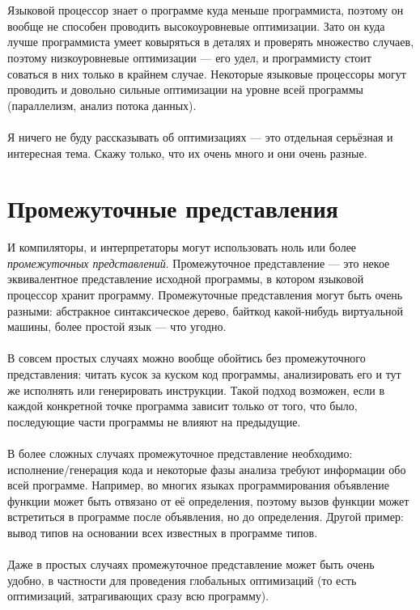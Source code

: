 \documentclass[11pt]{book}
\begin{document}
\\ \\
Языковой процессор знает о программе куда меньше программиста, поэтому он вообще не способен проводить высокоуровневые оптимизации.
Зато он куда лучше программиста умеет ковыряться в деталях и проверять множество случаев,
поэтому низкоуровневые оптимизации --- его удел, и программисту стоит соваться в них только в крайнем случае.
Некоторые языковые процессоры могут проводить и довольно сильные оптимизации
на уровне всей программы (параллелизм, анализ потока данных).
\\ \\
Я ничего не буду рассказывать об оптимизациях --- это отдельная серьёзная и интересная тема.
Скажу только, что их очень много и они очень разные.

\section{Промежуточные представления}
И компиляторы, и интерпретаторы могут использовать ноль или более \emph{промежуточных представлений}.
Промежуточное представление --- это некое эквивалентное представление исходной программы,
в котором языковой процессор хранит программу.
Промежуточные представления могут быть очень разными: абстракное синтаксическое дерево,
байткод какой-нибудь виртуальной машины, более простой язык --- что угодно.
\\ \\
В совсем простых случаях можно вообще обойтись без промежуточного представления:
читать кусок за куском код программы, анализировать его и тут же исполнять или генерировать инструкции.
Такой подход возможен, если в каждой конкретной точке программа зависит только от того, что было,
последующие части программы не влияют на предыдущие.
\\ \\
В более сложных случаях промежуточное представление необходимо:
исполнение/генерация кода и некоторые фазы анализа требуют информации обо всей программе.
Например, во многих языках программирования объявление функции может быть отвязано от её определения,
поэтому вызов функции может встретиться в программе после объявления, но до определения.
Другой пример: вывод типов на основании всех известных в программе типов.
\\ \\
Даже в простых случаях промежуточное представление может быть очень удобно,
в частности для проведения глобальных оптимизаций (то есть оптимизаций, затрагивающих сразу всю программу).
\end{document}
